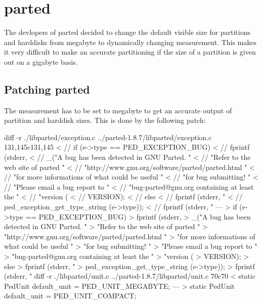 \section{parted}
The devlopers of parted decided to change the default visible size for partitions and harddisks from megabyte to dynamically changing measurement. This makes it very difficult to make an accurate partitioning if the size of a partition is given out on a gigabyte basis.

\subsection{Patching parted}
The measurement has to be set to megabyte to get an accurate output of partition and harddisk sizes. This is done by the following patch:
\begin{verbatim*}
diff -r ./libparted/exception.c ../parted-1.8.7/libparted/exception.c
131,145c131,145
< //    if (e->type == PED_EXCEPTION_BUG)
< //            fprintf (stderr,
< //                    _("A bug has been detected in GNU Parted.  "
< //                    "Refer to the web site of parted "
< //                    "http://www.gnu.org/software/parted/parted.html "
< //                    "for more informations of what could be useful "
< //                    "for bug submitting!  "
< //                    "Please email a bug report to "
< //                    "bug-parted@gnu.org containing at least the "
< //                    "version (%s) and the following message:  "),
< //                    VERSION);
< //    else
< //            fprintf (stderr, "%s: ",
< //                     ped_exception_get_type_string (e->type));
< //    fprintf (stderr, "%s\n", e->message);
---
>       if (e->type == PED_EXCEPTION_BUG)
>               fprintf (stderr,
>                       _("A bug has been detected in GNU Parted.  "
>                       "Refer to the web site of parted "
>                       "http://www.gnu.org/software/parted/parted.html "
>                       "for more informations of what could be useful "
>                       "for bug submitting!  "
>                       "Please email a bug report to "
>                       "bug-parted@gnu.org containing at least the "
>                       "version (%s) and the following message:  "),
>                       VERSION);
>       else
>               fprintf (stderr, "%s: ",
>                        ped_exception_get_type_string (e->type));
>       fprintf (stderr, "%s\n", e->message);
diff -r ./libparted/unit.c ../parted-1.8.7/libparted/unit.c
70c70
< static PedUnit default_unit = PED_UNIT_MEGABYTE;
---
> static PedUnit default_unit = PED_UNIT_COMPACT;
\end{verbatim*}

